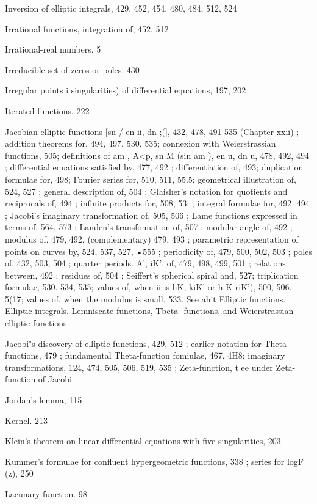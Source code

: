 Inversion of elliptic integrals, 429, 452, 454, 480, 484, 512, 524

Irrational functions, integration of, 452, 512

Irrational-real numbers, 5

%
%

Irreducible set of zeros or poles, 430

Irregular points i singularities) of differential equations, 197, 202

Iterated functions. 222

Jacobian elliptic functions [sn /  en ii, dn ;(], 432, 478, 491-535 (Chapter xxii) ; addition theorems
for, 494, 497, 530, 535; connexion with Weierstrassian functions, 505; definitions of am  ,
A<p, sn M (sin am  ), en u, dn u, 478, 492, 494 ; differential equations satisfied by, 477, 492 ;
differentiation of, 493; duplication formulae for, 498; Fourier series for, 510, 511, 55.5;
geometrical illustration of, 524, 527 ; general description of, 504 ; Glaisher's notation for
quotients and reciprocals of, 494 ; infinite products for, 508, 53:  ; integral formulae for, 492,
494 ; Jacobi's imaginary transformation of, 505, 506 ; Lame functions expressed in terms of,
564, 573 ; Landen's transfonnation of, 507 ; modular angle of, 492 ; modulus of, 479, 492,
(complementary) 479, 493 ; parametric representation of points on curves by, 524, 537, 527,
•555 ; periodicity of, 479, 500, 502, 503 ; poles of, 432, 503, 504 ; quarter periods. A', iK', of,
479, 498, 499, 501 ; relations between, 492 ; residues of, 504 ; Seiffert's spherical spiral and,
527; triplication formulae, 530. 534, 535; values of, when ii is hK, kiK' or h  K riK'), 500,
506. 5(17; values of. when the modulus is small, 533. See ahit Elliptic functions. Elliptic
integrals. Lemniscate functions, Tbeta- functions, and Weierstrassian elliptic functions

Jacobi"s discovery of elliptic functions, 429, 512 ; earlier notation for Theta-functions, 479 ;
fundamental Theta-function fomiulae, 467, 4H8; imaginary transformations, 124, 474, 505,
506, 519, 535 ; Zeta-function, t ee under Zeta-function of Jacobi

Jordan's lemma, 115

Kernel. 213

Klein's theorem on linear differential equations with five singularities, 203

Kummer's formulae for confluent hypergeometric functions, 338 ; series for logF (z), 250

Lacunary function. 98

